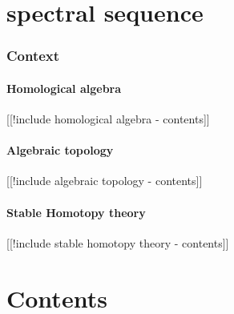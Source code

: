 \documentclass[12pt,titlepage]{article}
\theoremstyle{plain}
\theoremstyle{definition}
\theoremstyle{remark}
\begin{document}

\section*{spectral sequence}

\hypertarget{context}{}\subsubsection*{{Context}}\label{context}

\hypertarget{homological_algebra}{}\paragraph*{{Homological algebra}}\label{homological_algebra}

[[!include homological algebra - contents]]

\hypertarget{algebraic_topology}{}\paragraph*{{Algebraic topology}}\label{algebraic_topology}

[[!include algebraic topology - contents]]

\hypertarget{stable_homotopy_theory}{}\paragraph*{{Stable Homotopy theory}}\label{stable_homotopy_theory}

[[!include stable homotopy theory - contents]]

\hypertarget{contents}{}\section*{{Contents}}\label{contents}
\end{document}
